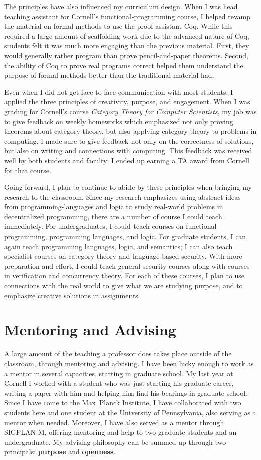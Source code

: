 \documentclass{article}
\theoremstyle{definition}
\begin{document}
The principles have also influenced my curriculum design.
When I was head teaching assistant for Cornell's functional-programming course, I helped revamp the material on formal methods to use the proof assistant Coq.
While this required a large amount of scaffolding work due to the advanced nature of Coq, students felt it was much more engaging than the previous material.
First, they would generally rather program than prove pencil-and-paper theorems.
Second, the ability of Coq to prove real programs correct helped them understand the purpose of formal methods better than the traditional material had.

Even when I did not get face-to-face communication with most students, I applied the three principles of creativity, purpose, and engagement.
When I was grading for Cornell's course \emph{Category Theory for Computer Scientists}, my job was to give feedback on weekly homeworks which emphasized not only proving theorems about category theory, but also applying category theory to problems in computing.
I made sure to give feedback not only on the correctness of solutions, but also on writing and connections with computing.
This feedback was received well by both students and faculty: I ended up earning a TA award from Cornell for that course.

Going forward, I plan to continue to abide by these principles when bringing my research to the classroom.
Since my research emphasizes using abstract ideas from programming-languages and logic to study real-world problems in decentralized programming, there are a number of course I could teach immediately.
For undergraduates, I could teach courses on functional programming, programming languages, and logic.
For graduate students, I can again teach programming languages, logic, and semantics; I can also teach specialist courses on category theory and language-based security.
With more preparation and effort, I could teach general security courses along with courses in verification and concurrency theory.
For each of these courses, I plan to use connections with the real world to give what we are studying purpose, and to emphasize creative solutions in assignments.

\section*{Mentoring and Advising}

A large amount of the teaching a professor does takes place outside of the classroom, through mentoring and advising.
I have been lucky enough to work as a mentor in several capacities, starting in graduate school.
My last year at Cornell I worked with a student who was just starting his graduate career, writing a paper with him and helping him find his bearings in graduate school.
Since I have come to the Max~Planck Institute, I have collaborated with two students here and one student at the University of Pennsylvania, also serving as a mentor when needed.
Moreover, I have also served as a mentor through SIGPLAN-M, offering mentoring and help to two graduate students and an undergraduate.
My advising philosophy can be summed up through two principals: \textbf{purpose} and \textbf{openness}.
\end{document}
